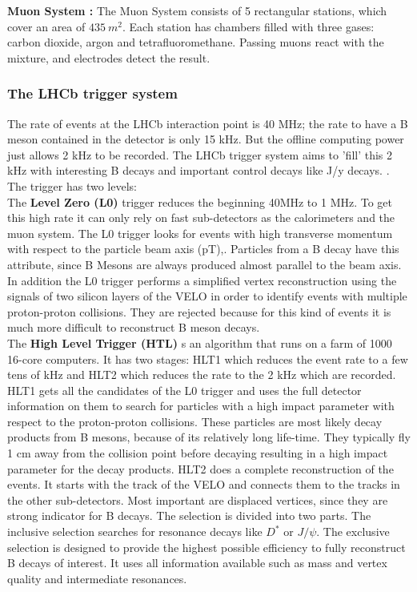 \documentclass[english]{uzhpub}
\begin{document}
\textbf{Muon System \cite{bib:muonSys} :} The Muon System consists of 5 rectangular stations, which cover an area of $\SI{435}{m^2}$.  Each station has chambers filled with three gases: carbon dioxide, argon and tetrafluoromethane. Passing muons react with the mixture, and electrodes detect the result.


\subsubsection{The LHCb trigger system}
The rate of events at the LHCb interaction point is 40 MHz;  the rate to have a B meson contained in the detector is only 15 kHz. But the offline computing power just allows 2 kHz to be recorded. The LHCb trigger system aims to ’fill’ this 2 kHz with interesting B decays and important control decays like J/y decays.  \cite{bib:JPsi}. The trigger has two levels: \\
The \textbf{Level Zero (L0)} trigger reduces the beginning 40MHz to 1 MHz. To get this high rate it can only rely on fast sub-detectors as the calorimeters and the muon system. The L0 trigger looks for events with high transverse momentum with respect to the particle beam axis (pT),. Particles from a B decay have this attribute, since B Mesons are always produced almost parallel to the beam axis.
In addition the L0 trigger performs a simplified vertex reconstruction using the signals of two silicon layers of the VELO in order to identify events with multiple proton-proton collisions. They are rejected because for this kind of events it is much more difficult to reconstruct B meson decays.  \\
The \textbf{High Level Trigger (HTL)} s an algorithm that runs on a farm of 1000 16-core computers. It has two stages: HLT1 which reduces the event rate to a few tens of kHz and HLT2 which reduces the rate to the 2 kHz which are recorded. HLT1 gets all the candidates of the L0 trigger and uses the full detector information on them to search for particles with a high impact parameter with respect to the proton-proton collisions. These particles are most likely decay products from B mesons, because of its relatively long life-time. They typically fly 1 cm away from the collision point before decaying resulting in a high impact parameter for the decay products. HLT2 does a complete reconstruction of the events. It starts with the track of the VELO and connects them to the tracks in the other sub-detectors. Most important are displaced vertices, since they are strong indicator for B decays. The selection is divided into two parts. The inclusive selection searches for resonance decays like $D^*$ or $J/\psi$. The exclusive selection is designed to provide the highest possible efficiency to fully reconstruct B decays of interest. It uses all information available such as mass and vertex quality and intermediate resonances.
\end{document}
